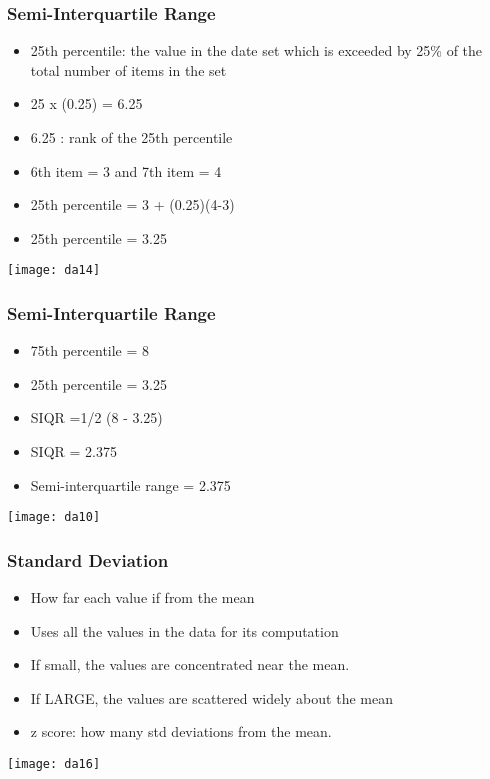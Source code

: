 \begin{frame}[fragile]\frametitle{Semi-Interquartile Range}	
\begin{itemize}
\item 25th percentile: the value in the date set which is exceeded by 25\% of the total number of items in the set
\item 25 x (0.25) = 6.25
\item 6.25 : rank of the 25th percentile
\item 6th item = 3 and 7th item = 4
\item 25th percentile = 3 + (0.25)(4-3)
\item 25th percentile = 3.25
\end{itemize}
\begin{center}
\texttt{[image: da14]}
\end{center}
\end{frame}


\begin{frame}[fragile]\frametitle{Semi-Interquartile Range}	
\begin{itemize}
\item 75th percentile = 8
\item 25th percentile = 3.25
\item SIQR =1/2 (8 - 3.25)
\item SIQR = 2.375
\item Semi-interquartile range = 2.375
\end{itemize}

\begin{center}
\texttt{[image: da10]}
\end{center}
\end{frame}



\begin{frame}[fragile]\frametitle{Standard Deviation}	
\begin{itemize}
\item How far each value if from the mean
\item Uses all the values in the data for its computation
\item If small, the values are concentrated near the mean.
\item If LARGE, the values are scattered widely about the mean
\item z score: how many std deviations from the mean.
\end{itemize}
\begin{center}
\texttt{[image: da16]}
\end{center}
\end{frame}


